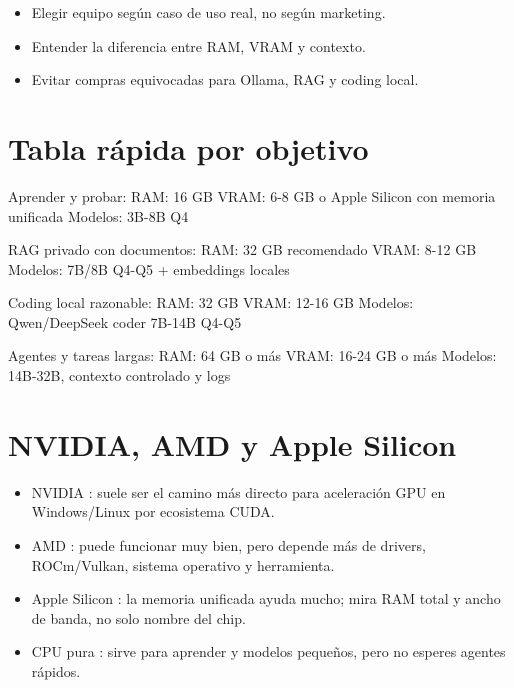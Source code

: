 \documentclass[11pt,a4paper]{book}
\begin{document}
\begin{itemize}\item Elegir equipo según caso de uso real, no según marketing.\end{itemize}
\begin{itemize}\item Entender la diferencia entre RAM, VRAM y contexto.\end{itemize}
\begin{itemize}\item Evitar compras equivocadas para Ollama, RAG y coding local.\end{itemize}
\section{Tabla rápida por objetivo}
\begin{codebox}
Aprender y probar:
  RAM: 16 GB
  VRAM: 6-8 GB o Apple Silicon con memoria unificada
  Modelos: 3B-8B Q4

RAG privado con documentos:
  RAM: 32 GB recomendado
  VRAM: 8-12 GB
  Modelos: 7B/8B Q4-Q5 + embeddings locales

Coding local razonable:
  RAM: 32 GB
  VRAM: 12-16 GB
  Modelos: Qwen/DeepSeek coder 7B-14B Q4-Q5

Agentes y tareas largas:
  RAM: 64 GB o más
  VRAM: 16-24 GB o más
  Modelos: 14B-32B, contexto controlado y logs
\end{codebox}
\section{NVIDIA, AMD y Apple Silicon}
\begin{itemize}\item NVIDIA : suele ser el camino más directo para aceleración GPU en Windows/Linux por ecosistema CUDA.\end{itemize}
\begin{itemize}\item AMD : puede funcionar muy bien, pero depende más de drivers, ROCm/Vulkan, sistema operativo y herramienta.\end{itemize}
\begin{itemize}\item Apple Silicon : la memoria unificada ayuda mucho; mira RAM total y ancho de banda, no solo nombre del chip.\end{itemize}
\begin{itemize}\item CPU pura : sirve para aprender y modelos pequeños, pero no esperes agentes rápidos.\end{itemize}
\end{document}

